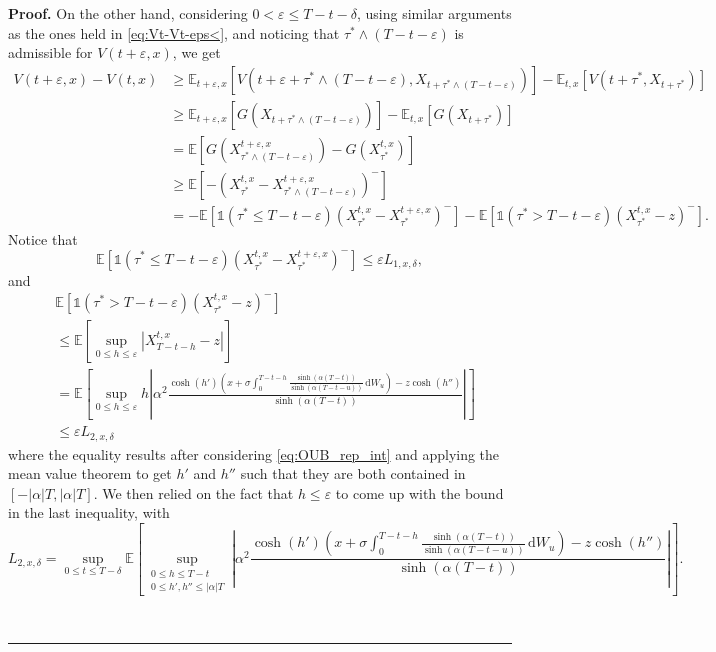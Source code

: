 \documentclass{tufte-handout}
\newcommand{\E}{\mathbb{E}} %
\newenvironment{pf}[1][Proof]{\textbf{#1.} }{\ \rule{0.5em}{0.5em}}
\begin{document}
\begin{pf}
		On the other hand, considering $0 < \varepsilon \leq T - t - \delta$, using similar arguments as the ones held in \eqref{eq:Vt-Vt-eps<}, and noticing that $\tau^*\wedge(T - t - \varepsilon)$ is admissible for $V(t + \varepsilon, x)$, we get
		\begin{align}
		V(t + \varepsilon, x) - V(t, x) &\geq \E_{t + \varepsilon, x}\left[V\left(t + \varepsilon + \tau^*\wedge(T - t - \varepsilon), X_{t + \tau^*\wedge(T - t - \varepsilon)}\right)\right] - \E_{t, x}\left[V\left(t + \tau^*, X_{t + \tau^*}\right)\right] \nonumber \\
		&\geq \E_{t + \varepsilon, x}\left[G\left(X_{t + \tau^*\wedge(T - t - \varepsilon)}\right)\right] - \E_{t, x}\left[G\left(X_{t + \tau^*}\right)\right] \nonumber \\
		&= \E\left[G\left(X_{\tau^*\wedge(T - t - \varepsilon)}^{t + \varepsilon, x}\right) - G\left(X_{\tau^*}^{t, x}\right)\right] \nonumber \\
		&\geq \E\left[-\left(X_{\tau^*}^{t, x} - X_{\tau^*\wedge(T - t -\varepsilon)}^{t + \varepsilon, x}\right)^-\right] \nonumber \\
		&= -\E\left[\mathbb{1}(\tau^*\leq T - t - \varepsilon)\left(X_{\tau^*}^{t, x} - X_{\tau^*}^{t + \varepsilon, x}\right)^-\right] - \E\left[\mathbb{1}(\tau^* > T - t - \varepsilon)\left(X_{\tau^*}^{t, x} - z\right)^-\right]. \label{eq:Vt+eps-Vt>}
		\end{align}
		Notice that
		$$
		\E\left[\mathbb{1}(\tau^*\leq T - t - \varepsilon)\left(X_{\tau^*}^{t, x} - X_{\tau^*}^{t + \varepsilon, x}\right)^-\right] \leq \varepsilon L_{1, x, \delta},
		$$
		and
		\begin{align}
		&\E\left[\mathbb{1}(\tau^* > T - t - \varepsilon)\left(X_{\tau^*}^{t, x} - z\right)^-\right] \nonumber \\
		&\leq \E\left[\sup_{0 \leq h\leq \varepsilon}\left|X_{T - t - h}^{t, x} - z\right|\right] \nonumber \\
		&= \E\left[\sup_{0 \leq h\leq \varepsilon}h\left|\alpha^2\frac{\cosh(h')\left(x + \sigma\int_{0}^{T - t -h} \frac{\sinh(\alpha (T - t))}{\sinh(\alpha (T - t - u))}\,\mathrm{d}W_u\right) - z\cosh(h'')}{\sinh(\alpha (T - t))}\right|\right] \nonumber \\
		&\leq \varepsilon L_{2, x, \delta} \nonumber
		\end{align}
		where the equality results after considering \eqref{eq:OUB_rep_int} and applying the mean value theorem to get $h'$ and $h''$ such that they are both contained in $[-|\alpha|T, |\alpha|T]$. We then relied on the fact that $h \leq \varepsilon$ to come up with the bound in the last inequality, with
		$$
		L_{2, x, \delta} = \sup_{0\leq t \leq T - \delta}\E\left[\sup_{\substack{0 \leq h \leq T - t \\ 0 \leq h', h'' \leq |\alpha|T}}\left|\alpha^2\frac{\cosh(h')\left(x + \sigma\int_{0}^{T - t - h} \frac{\sinh(\alpha (T - t))}{\sinh(\alpha (T - t - u))}\,\mathrm{d}W_u\right) - z\cosh(h'')}{\sinh(\alpha (T - t))}\right|\right].
		$$
		

\end{pf}
\end{document}

